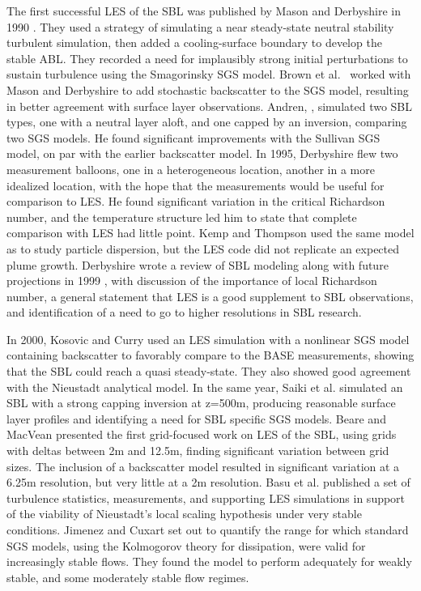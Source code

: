 \documentclass[conf]{new-aiaa}
\begin{document}
The first successful LES of the SBL was published by Mason and Derbyshire in 1990 \cite{Mason1990}. They used a strategy of simulating a near steady-state neutral stability turbulent simulation, then added a cooling-surface boundary to develop the stable ABL. They recorded a need for implausibly strong initial perturbations to sustain turbulence using the Smagorinsky SGS model. Brown et al.\ \cite{Brown1994} worked with Mason and Derbyshire to add stochastic backscatter to the SGS model, resulting in better agreement with surface layer observations. Andren, \cite{Andren1995}, simulated two SBL types, one with a neutral layer aloft, and one capped by an inversion, comparing two SGS models. He found significant improvements with the Sullivan SGS model, on par with the earlier backscatter model. In 1995, Derbyshire flew two measurement balloons, one in a heterogeneous location, another in a more idealized location, with the hope that the measurements would be useful for comparison to LES. He found significant variation in the critical Richardson number, and the temperature structure led him to state that complete comparison with LES had little point. Kemp and Thompson \cite{Kemp1996} used the same model as \cite{Brown1994} to study particle dispersion, but the LES code did not replicate an expected plume growth. Derbyshire wrote a review of SBL modeling along with future projections in 1999 \cite{Derbyshire1999}, with discussion of the importance of local Richardson number, a general statement that LES is a good supplement to SBL observations, and identification of a need to go to higher resolutions in SBL research. 

In 2000, Kosovic and Curry \cite{Kosovic2000} used an LES simulation with a nonlinear SGS model containing backscatter to favorably compare to the BASE measurements, showing that the SBL could reach a quasi steady-state. They also showed good agreement with the Nieustadt analytical model. In the same year, Saiki et al. \cite{Saiki2000} simulated an SBL with a strong capping inversion at z=500m, producing reasonable surface layer profiles and identifying a need for SBL specific SGS models. Beare and MacVean \cite{Beare2004} presented the first grid-focused work on LES of the SBL, using grids with deltas between 2m and 12.5m, finding significant variation between grid sizes. The inclusion of a backscatter model resulted in significant variation at a 6.25m resolution, but very little at a 2m resolution. Basu et al. \cite{Basu2005} published a set of turbulence statistics, measurements, and supporting LES simulations in support of the viability of Nieustadt's local scaling hypothesis under very stable conditions. Jimenez and Cuxart \cite{Jimenez2005} set out to quantify the range for which standard SGS models, using the Kolmogorov theory for dissipation, were valid for increasingly stable flows. They found the model to perform adequately for weakly stable, and some moderately stable flow regimes. 
\end{document}

